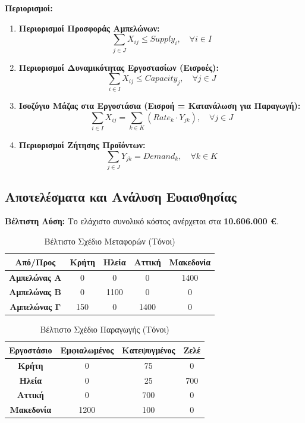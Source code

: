 \documentclass[12pt, a4paper]{article}
\begin{document}
\textbf{Περιορισμοί:}
\begin{enumerate}
    \item \textbf{Περιορισμοί Προσφοράς Αμπελώνων:}
    $$ \sum_{j \in J} X_{ij} \le Supply_i, \quad \forall i \in I $$
    \item \textbf{Περιορισμοί Δυναμικότητας Εργοστασίων (Εισροές):}
    $$ \sum_{i \in I} X_{ij} \le Capacity_j, \quad \forall j \in J $$
    \item \textbf{Ισοζύγιο Μάζας στα Εργοστάσια (Εισροή = Κατανάλωση για Παραγωγή):}
    $$ \sum_{i \in I} X_{ij} = \sum_{k \in K} (Rate_k \cdot Y_{jk}), \quad \forall j \in J $$
    \item \textbf{Περιορισμοί Ζήτησης Προϊόντων:}
    $$ \sum_{j \in J} Y_{jk} = Demand_k, \quad \forall k \in K $$
\end{enumerate}

\subsection*{Αποτελέσματα και Ανάλυση Ευαισθησίας}

\textbf{Βέλτιστη Λύση:}
Το ελάχιστο συνολικό κόστος ανέρχεται στα \textbf{10.606.000 €}.

\begin{table}[h]
\centering
\caption{Βέλτιστο Σχέδιο Μεταφορών (Τόνοι)}
\begin{tabular}{|c|c|c|c|c|}
\hline
\textbf{Από/Προς} & \textbf{Κρήτη} & \textbf{Ηλεία} & \textbf{Αττική} & \textbf{Μακεδονία} \\ \hline
\textbf{Αμπελώνας Α} & 0 & 0 & 0 & 1400 \\ \hline
\textbf{Αμπελώνας Β} & 0 & 1100 & 0 & 0 \\ \hline
\textbf{Αμπελώνας Γ} & 150 & 0 & 1400 & 0 \\ \hline
\end{tabular}
\end{table}

\begin{table}[h]
\centering
\caption{Βέλτιστο Σχέδιο Παραγωγής (Τόνοι)}
\begin{tabular}{|c|c|c|c|}
\hline
\textbf{Εργοστάσιο} & \textbf{Εμφιαλωμένος} & \textbf{Κατεψυγμένος} & \textbf{Ζελέ} \\ \hline
\textbf{Κρήτη} & 0 & 75 & 0 \\ \hline
\textbf{Ηλεία} & 0 & 25 & 700 \\ \hline
\textbf{Αττική} & 0 & 700 & 0 \\ \hline
\textbf{Μακεδονία} & 1200 & 100 & 0 \\ \hline
\end{tabular}
\end{table}
\end{document}
